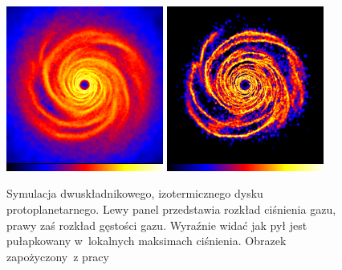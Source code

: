 \begin{figure}
   \centering
   \includegraphics[width=0.46\textwidth]{figures/chap1_gasdisk.png}
   \includegraphics[width=0.46\textwidth]{figures/chap1_dustdisk.png}
   \caption{Symulacja dwuskładnikowego, izotermicznego dysku
      pro\-to\-pla\-ne\-tar\-ne\-go.
      Lewy panel przedstawia rozkład ciśnienia gazu, prawy zaś rozkład gęstości
      gazu. Wy\-raź\-nie widać jak pył jest pułapkowany w~lokalnych maksimach
      ciśnienia. Obrazek za\-po\-ży\-czo\-ny~z pracy~\cite{RLP2006}}
   \label{fig:chap1_trap}
\end{figure}

